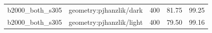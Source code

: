\begin{longtable}{l>{\raggedright\arraybackslash}p{.42\linewidth}rrr}
b2000\_\allowbreak{}both\_\allowbreak{}s305 & %
geometry:pjhanzlik/dark & %
400 & %
81.75 & %
99.25 \\ %

b2000\_\allowbreak{}both\_\allowbreak{}s305 & %
geometry:pjhanzlik/light & %
400 & %
79.50 & %
99.16 \\ %


\end{longtable}
